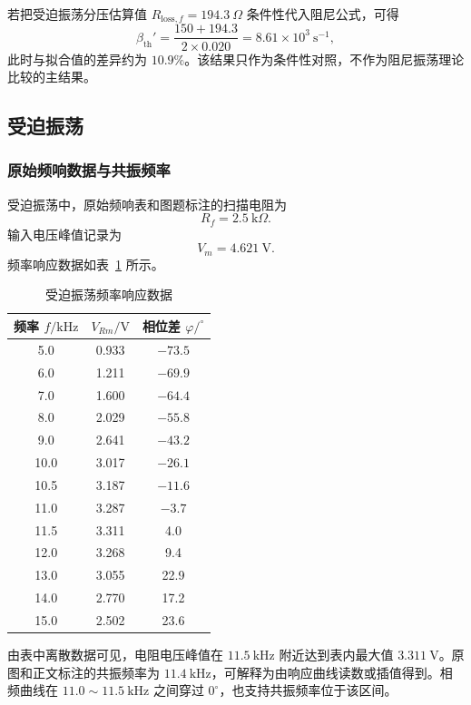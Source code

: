﻿\documentclass[UTF8,12pt,a4paper]{ctexart}
\numberwithin{equation}{section}
\begin{document}
若把受迫振荡分压估算值 \(R_{\mathrm{loss},f}=194.3\ \Omega\) 条件性代入阻尼公式，可得
\begin{equation}
    \beta_{\mathrm{th}}'
    =\frac{150+194.3}{2\times0.020}
    =8.61\times10^3\ \mathrm{s^{-1}},
\end{equation}
此时与拟合值的差异约为 \(10.9\%\)。该结果只作为条件性对照，不作为阻尼振荡理论比较的主结果。

\subsection{受迫振荡}

\subsubsection{原始频响数据与共振频率}

受迫振荡中，原始频响表和图题标注的扫描电阻为
\[
    R_f=2.5\ \mathrm{k}\Omega.
\]
输入电压峰值记录为
\[
    V_m=4.621\ \mathrm{V}.
\]
频率响应数据如表~\ref{tab:freq-data} 所示。

\begin{table}[H]
\centering
\caption{受迫振荡频率响应数据}
\label{tab:freq-data}
\begin{tabular}{ccc}
\toprule
频率 \(f/\mathrm{kHz}\) & \(V_{Rm}/\mathrm{V}\) & 相位差 \(\varphi/^\circ\) \\
\midrule
5.0 & 0.933 & \(-73.5\) \\
6.0 & 1.211 & \(-69.9\) \\
7.0 & 1.600 & \(-64.4\) \\
8.0 & 2.029 & \(-55.8\) \\
9.0 & 2.641 & \(-43.2\) \\
10.0 & 3.017 & \(-26.1\) \\
10.5 & 3.187 & \(-11.6\) \\
11.0 & 3.287 & \(-3.7\) \\
11.5 & 3.311 & 4.0 \\
12.0 & 3.268 & 9.4 \\
13.0 & 3.055 & 22.9 \\
14.0 & 2.770 & 17.2 \\
15.0 & 2.502 & 23.6 \\
\bottomrule
\end{tabular}
\end{table}

由表中离散数据可见，电阻电压峰值在 \(11.5\ \mathrm{kHz}\) 附近达到表内最大值 \(3.311\ \mathrm{V}\)。原图和正文标注的共振频率为 \(11.4\ \mathrm{kHz}\)，可解释为由响应曲线读数或插值得到。相频曲线在 \(11.0\sim11.5\ \mathrm{kHz}\) 之间穿过 \(0^\circ\)，也支持共振频率位于该区间。
\end{document}
